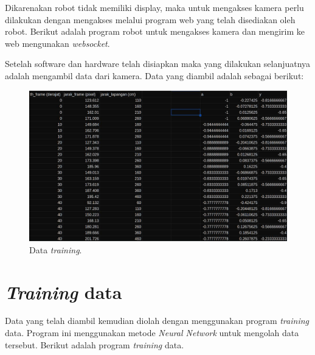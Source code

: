 Dikarenakan robot tidak memiliki display, maka untuk mengakses kamera perlu dilakukan dengan mengakses melalui program web yang telah disediakan oleh robot. Berikut adalah program robot untuk mengakses kamera dan mengirim ke web mengunakan \textit{websocket}.







Setelah software dan hardware telah disiapkan maka yang dilakukan selanjuatnya adalah mengambil data dari kamera. Data yang diambil adalah sebagai berikut:
\begin{figure}[H]
  \centering
  \includegraphics[scale=0.50]{gambar/data.jpg}
  \caption{Data \textit{training}.}
  \label{fig:datatraining}
\end{figure}

\section{\textit{Training} data
  \label{sec:trainingdata}}

Data yang telah diambil kemudian diolah dengan menggunakan program \textit{training} data. Program ini menggunakan metode \textit{Neural Network} untuk mengolah data tersebut. Berikut adalah program \textit{training} data.



